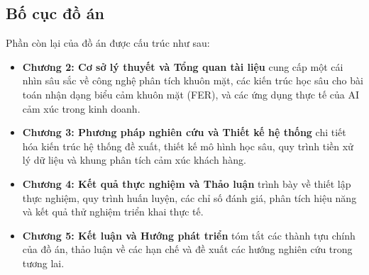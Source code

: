 \subsection{Bố cục đồ án}
Phần còn lại của đồ án được cấu trúc như sau:
\begin{itemize}
    \item \textbf{Chương 2: Cơ sở lý thuyết và Tổng quan tài liệu} cung cấp một cái nhìn sâu sắc về công nghệ phân tích khuôn mặt, các kiến trúc học sâu cho bài toán nhận dạng biểu cảm khuôn mặt (FER), và các ứng dụng thực tế của AI cảm xúc trong kinh doanh.
    \item \textbf{Chương 3: Phương pháp nghiên cứu và Thiết kế hệ thống} chi tiết hóa kiến trúc hệ thống đề xuất, thiết kế mô hình học sâu, quy trình tiền xử lý dữ liệu và khung phân tích cảm xúc khách hàng.
    \item \textbf{Chương 4: Kết quả thực nghiệm và Thảo luận} trình bày về thiết lập thực nghiệm, quy trình huấn luyện, các chỉ số đánh giá, phân tích hiệu năng và kết quả thử nghiệm triển khai thực tế.
    \item \textbf{Chương 5: Kết luận và Hướng phát triển} tóm tắt các thành tựu chính của đồ án, thảo luận về các hạn chế và đề xuất các hướng nghiên cứu trong tương lai.
\end{itemize}